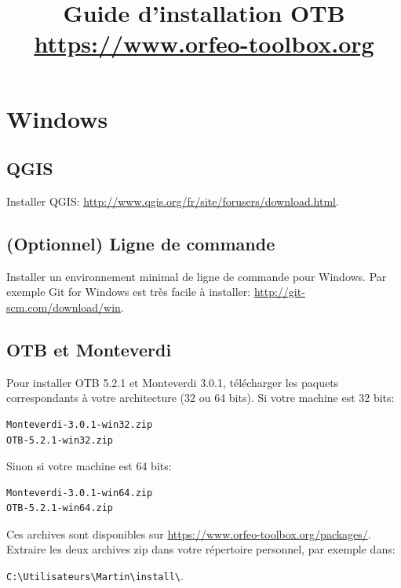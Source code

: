 \documentclass[10pt,a4paper]{article}
\title{Guide d'installation OTB\\
  {\small\url{https://www.orfeo-toolbox.org}}
}
\begin{document}
\maketitle

\section{Windows}

\subsection{QGIS}
Installer QGIS: \url{http://www.qgis.org/fr/site/forusers/download.html}.
\subsection{(Optionnel) Ligne de commande}
Installer un environnement minimal de ligne de commande pour Windows. Par exemple
Git for Windows est très facile à installer:
\url{http://git-scm.com/download/win}.

\subsection{OTB et Monteverdi}
Pour installer OTB 5.2.1 et Monteverdi 3.0.1, télécharger les paquets
correspondants à votre architecture (32 ou 64 bits). Si votre machine est 32
bits:

\begin{verbatim}
Monteverdi-3.0.1-win32.zip
OTB-5.2.1-win32.zip
\end{verbatim}

Sinon si votre machine est 64 bits:

\begin{verbatim}
Monteverdi-3.0.1-win64.zip
OTB-5.2.1-win64.zip
\end{verbatim}

Ces archives sont disponibles sur \url{https://www.orfeo-toolbox.org/packages/}.
Extraire les deux archives zip dans votre répertoire personnel, par exemple dans:\\
\begin{centering}
\texttt{C:{\textbackslash}Utilisateurs{\textbackslash}Martin{\textbackslash}install{\textbackslash}}.
\end{centering}
\end{document}
